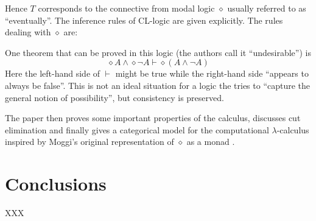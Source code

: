 \documentclass[12pt,toc=bibliography,numbers=noendperiod,
               footnotes=multiple,twoside]{scrartcl}
\begin{document}
Hence \(T\) corresponds to the connective from modal logic \(\diamond\) usually referred to as \enquote{eventually}. The inference rules of CL-logic are given explicitly. The rules dealing with \(\diamond\) are:

\begin{figure}[h]
\begin{minipage}[b]{1\linewidth}
\centering
\begin{minipage}[b]{0.45\linewidth}
\begin{prooftree}
\end{prooftree}
\end{minipage}
\begin{minipage}[b]{0.35\linewidth}
\begin{prooftree}
\end{prooftree}
\end{minipage}
\end{minipage}
\end{figure}

One theorem that can be proved in this logic (the authors call it \enquote{undesirable}) is \[\diamond A \wedge \diamond \neg A \vdash \diamond (A \wedge \neg A)\] Here the left-hand side of \(\vdash\) might be true while the right-hand side \enquote{appears to always be false}. This is not an ideal situation for a logic the tries to \enquote{capture the general notion of possibility}, but consistency is preserved.

The paper then proves some important properties of the calculus, discusses cut elimination and finally gives a categorical model for the computational \(\lambda\)-calculus inspired by Moggi's original representation of \(\diamond\) as a monad \autocite{moggi_notions_1991}.

\section{Conclusions}

XXX

\printbibliography
\end{document}
